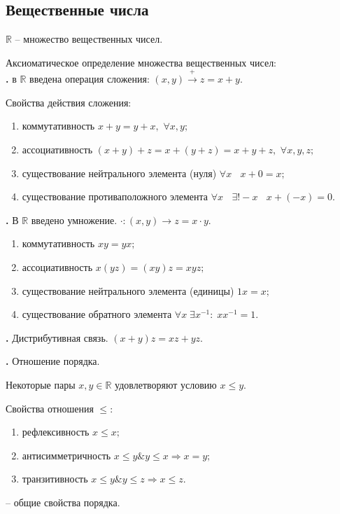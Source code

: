 \documentclass{article}
\newcommand{\RomanNumeralCaps}[1]
    {\MakeUppercase{\romannumeral #1}}
\begin{document}
\subsection{Вещественные  числа}
$\mathbb{R}$ -- множество вещественных чисел.

Аксиоматическое определение множества вещественных чисел:\\

{\bf \RomanNumeralCaps{1}.} в $\mathbb{R}$ введена операция сложения: $(x,y) \xrightarrow{\text{+}} z=x+y.$
\par Свойства действия сложения:
\begin{enumerate}
\item коммутативность \quad  $x+y=y+x,$ $\forall x, y ;$
\item ассоциативность \quad  $(x+y)+z=x+(y+z)=x+y+z,$ $\forall x, y, z ;$
\item существование нейтрального элемента (нуля) \quad $\forall x\;\;$ $x+0=x;$
\item существование противаположного элемента \quad $\forall x\;\;$  $\exists ! -x\;\;$ $x+(-x)=0.$
\end{enumerate}

{\bf \RomanNumeralCaps{2}.} В $\mathbb{R}$ введено умножение. $\cdot:(x,y)\rightarrow z=x\cdot y.$
\begin{enumerate}
\item коммутативность \quad $xy=yx;$
\item ассоциативность \quad $x(yz)=(xy)z=xyz;$
\item существование нейтрального элемента (единицы) \quad $1x=x;$
\item существование обратного элемента \quad $\forall x \; \exists x^{-1}: \; xx^{-1}=1.$
\end{enumerate}

{\bf \RomanNumeralCaps{3}.} Дистрибутивная связь. $(x+y)z=xz+yz.$

{\bf \RomanNumeralCaps{4}.} Отношение порядка. 

Некоторые пары $x,y\in\mathbb{R}$ удовлетворяют условию $x\leq y.$

Свойства отношения $\leq:$
\begin{enumerate}
\item рефлексивность \quad $x\leq x;$
\item антисимметричность \quad $x\leq y \& y\leq x \Rightarrow x=y;$
\item транзитивность \quad $x\leq y \& y\leq z \Rightarrow x\leq z.$
\end{enumerate}
-- общие свойства порядка.\\
\end{document}
